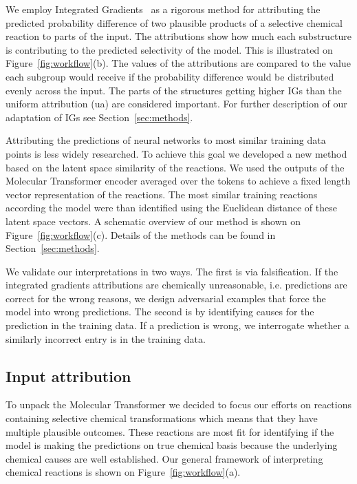 We employ Integrated Gradients~\cite{Sundararajan2017} as a rigorous method for attributing the predicted probability difference of two plausible products of a selective chemical reaction to parts of the input. The attributions show how much each substructure is contributing to the predicted selectivity of the model. This is illustrated on Figure~\ref{fig:workflow}(b). The values of the attributions are compared to the value each subgroup would receive if the probability difference would be distributed evenly across the input. The parts of the structures getting higher IGs than the uniform attribution (ua) are considered important. For further description of our adaptation of IGs see Section~\ref{sec:methods}.\par

Attributing the predictions of neural networks to most similar training data points is less widely researched. To achieve this goal we developed a new method based on the latent space similarity of the reactions. We used the outputs of the Molecular Transformer encoder averaged over the tokens to achieve a fixed length vector representation of the reactions. The most similar training reactions according the model were than identified using the Euclidean distance of these latent space vectors. A schematic overview of our method is shown on Figure~\ref{fig:workflow}(c). Details of the methods can be found in Section~\ref{sec:methods}. 

We validate our interpretations in two ways. The first is via falsification. If the integrated gradients attributions are chemically unreasonable, i.e. predictions are correct for the wrong reasons, we design adversarial examples that force the model into wrong predictions. The second is by identifying causes for the prediction in the training data. If a prediction is wrong, we interrogate whether a similarly incorrect entry is in the training data. 


\subsection*{Input attribution}
To unpack the Molecular Transformer we decided to focus our efforts on reactions containing selective chemical transformations which means that they have multiple plausible outcomes. These reactions are most fit for identifying if the model is making the predictions on true chemical basis because the underlying chemical causes are well established. Our general framework of interpreting chemical reactions is shown on Figure~\ref{fig:workflow}(a).

